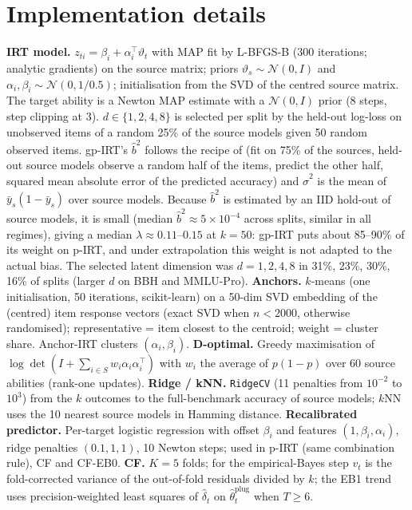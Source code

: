 \section{Implementation details}
\label{app:impl}
\textbf{IRT model.} $z_{ti}=\beta_i+\alpha_i^\top\vartheta_t$ with MAP fit by L-BFGS-B (300 iterations; analytic gradients) on the source matrix; priors $\vartheta_s\sim\mathcal N(0,I)$ and $\alpha_i,\beta_i\sim\mathcal N(0,1/0.5)$; initialisation from the SVD of the centred source matrix. The target ability is a Newton MAP estimate with a $\mathcal N(0,I)$ prior (8 steps, step clipping at 3). $d\in\{1,2,4,8\}$ is selected per split by the held-out log-loss on unobserved items of a random 25\% of the source models given 50 random observed items. gp-IRT's $\hat b^2$ follows the recipe of \citet{maiapolo2024tiny} (fit on 75\% of the sources, held-out source models observe a random half of the items, predict the other half, squared mean absolute error of the predicted accuracy) and $\hat\sigma^2$ is the mean of $\bar y_s(1-\bar y_s)$ over source models. Because $\hat b^2$ is estimated by an IID hold-out of source models, it is small (median $\hat b^2\approx5\times10^{-4}$ across splits, similar in all regimes), giving a median $\lambda\approx0.11$--$0.15$ at $k=50$: gp-IRT puts about 85--90\% of its weight on p-IRT, and under extrapolation this weight is not adapted to the actual bias. The selected latent dimension was $d=1,2,4,8$ in 31\%, 23\%, 30\%, 16\% of splits (larger $d$ on BBH and MMLU-Pro).
\textbf{Anchors.} $k$-means (one initialisation, 50 iterations, scikit-learn) on a 50-dim SVD embedding of the (centred) item response vectors (exact SVD when $n<2000$, otherwise randomised); representative = item closest to the centroid; weight = cluster share. Anchor-IRT clusters $(\alpha_i,\beta_i)$.
\textbf{D-optimal.} Greedy maximisation of $\log\det(I+\sum_{i\in S}w_i\alpha_i\alpha_i^\top)$ with $w_i$ the average of $p(1-p)$ over 60 source abilities (rank-one updates).
\textbf{Ridge / kNN.} \texttt{RidgeCV} (11 penalties from $10^{-2}$ to $10^3$) from the $k$ outcomes to the full-benchmark accuracy of source models; $k$NN uses the 10 nearest source models in Hamming distance.
\textbf{Recalibrated predictor.} Per-target logistic regression with offset $\beta_i$ and features $(1,\beta_i,\alpha_i)$, ridge penalties $(0.1,1,1)$, 10 Newton steps; used in p-IRT (same combination rule), CF and CF-EB0.
\textbf{CF.} $K=5$ folds; for the empirical-Bayes step $v_t$ is the fold-corrected variance of the out-of-fold residuals divided by $k$; the \textsc{EB1} trend uses precision-weighted least squares of $\hat\delta_t$ on $\hat\theta^{\mathrm{plug}}_t$ when $T\ge6$.

